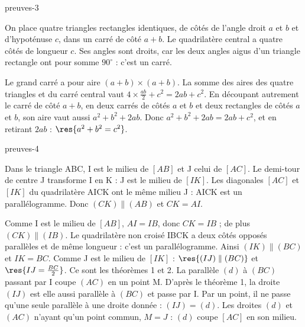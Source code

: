 \begin{blocEdition}{preuves-3}

On place quatre triangles rectangles identiques, de côtés de l’angle droit $a$ et $b$ et d’hypoténuse $c$, dans un carré de côté $a+b$. Le quadrilatère central a quatre côtés de longueur $c$. Ses angles sont droits, car les deux angles aigus d’un triangle rectangle ont pour somme $90^\circ$ : c’est un carré.
\label{fig-preuves-3-preuve-pythagore}

Le grand carré a pour aire $(a+b)\times(a+b)$. La somme des aires des quatre triangles et du carré central vaut $4\times\frac{ab}2+c^2=2ab+c^2$.
En découpant autrement le carré de côté $a+b$, en deux carrés de côtés $a$ et $b$ et deux rectangles de côtés $a$ et $b$, son aire vaut aussi $a^2+b^2+2ab$. Donc $a^2+b^2+2ab=2ab+c^2$, et en retirant $2ab$ : $\res{a^2+b^2=c^2}$.
\end{blocEdition}
\begin{blocEdition}{preuves-4}

Dans le triangle ABC, I est le milieu de $[AB]$ et J celui de $[AC]$. Le demi-tour de centre J transforme I en K : J est le milieu de $[IK]$. Les diagonales $[AC]$ et $[IK]$ du quadrilatère AICK ont le même milieu J : AICK est un parallélogramme. Donc $(CK)\parallel(AB)$ et $CK=AI$.
\label{fig-preuves-4-preuve-milieux}

Comme I est le milieu de $[AB]$, $AI=IB$, donc $CK=IB$ ; de plus $(CK)\parallel(IB)$. Le quadrilatère non croisé IBCK a deux côtés opposés parallèles et de même longueur : c’est un parallélogramme. Ainsi $(IK)\parallel(BC)$ et $IK=BC$. Comme J est le milieu de $[IK]$ : $\res{(IJ)\parallel(BC)}$ et $\res{IJ=\frac{BC}2}$. Ce sont les théorèmes 1 et 2.
La parallèle $(d)$ à $(BC)$ passant par I coupe $(AC)$ en un point M. D’après le théorème 1, la droite $(IJ)$ est elle aussi parallèle à $(BC)$ et passe par I. Par un point, il ne passe qu’une seule parallèle à une droite donnée : $(IJ)=(d)$. Les droites $(d)$ et $(AC)$ n’ayant qu’un point commun, $M=J$ : $(d)$ coupe $[AC]$ en son milieu.
\end{blocEdition}
